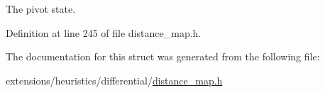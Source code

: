 The pivot state. 



Definition at line 245 of file distance\+\_\+map.\+h.



The documentation for this struct was generated from the following file\+:\begin{DoxyCompactItemize}
\item 
extensions/heuristics/differential/\hyperlink{distance__map_8h}{distance\+\_\+map.\+h}\end{DoxyCompactItemize}
